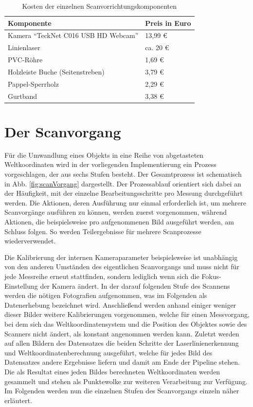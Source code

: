 \begin{table} %
	\centering
		\begin{tabular}{l | l}
		\textbf{Komponente} & \textbf{Preis in Euro}\\
		\hline
			Kamera "`TeckNet C016 USB HD Webcam"' & 13,99 \euro\\
			Linienlaser &  ca. 20 \euro\\
			PVC-Röhre & 1,69 \euro\\
			Holzleiste Buche (Seitenstreben) & 3,79 \euro\\
			Pappel-Sperrholz &  2,29 \euro\\
			Gurtband & 3,38 \euro
		\end{tabular}
	\caption{Kosten der einzelnen Scanvorrichtungskomponenten}
	\label{tab:preise}
\end{table}


\section{Der Scanvorgang}
\label{sec:scanvorgang}
Für die Umwandlung eines Objekts in eine Reihe von abgetasteten Weltkoordinaten wird in der vorliegenden Implementierung ein Prozess vorgeschlagen, der aus sechs Stufen besteht. Der Gesamtprozess ist schematisch in Abb. \ref{fig:scanVorgang} dargestellt. Der Prozessablauf orientiert sich dabei an der Häufigkeit, mit der einzelne Bearbeitungsschritte pro Messung durchgeführt werden. Die Aktionen, deren Ausführung nur einmal erforderlich ist, um mehrere Scanvorgänge ausführen zu können, werden zuerst vorgenommen, während Aktionen, die beispielsweise pro aufgenommenen Bild ausgeführt werden, am Schluss folgen. So werden Teilergebnisse für mehrere Scanprozesse wiederverwendet.
\bigbreak

Die Kalibrierung der internen Kameraparameter beispielsweise ist unabhängig von den anderen Umständen des eigentlichen Scanvorgangs und muss nicht für jede Messreihe erneut stattfinden, sondern lediglich wenn sich die Fokus-Einstellung der Kamera ändert. In der darauf folgenden Stufe des Scannens werden die nötigen Fotografien aufgenommen, was im Folgenden als Datenerhebung bezeichnet wird. Anschließend werden anhand einiger weniger dieser Bilder weitere Kalibrierungen vorgenommen, welche für einen Messvorgang, bei dem sich das Weltkoordinatensystem und die Position des Objektes sowie des Scanners nicht ändert, als konstant angenommen werden kann. Zuletzt werden auf allen Bildern des Datensatzes die beiden Schritte der Laserlinienerkennung und Weltkoordinatenberechnung ausgeführt, welche für jedes Bild des Datensatzes andere Ergebnisse liefern und damit am Ende der Pipeline stehen. Die als Resultat eines jeden Bildes berechneten Weltkoordinaten werden gesammelt und stehen als Punktewolke zur weiteren Verarbeitung zur Verfügung. Im Folgenden werden nun die einzelnen Stufen des Scanvorgangs einzeln näher erläutert.


